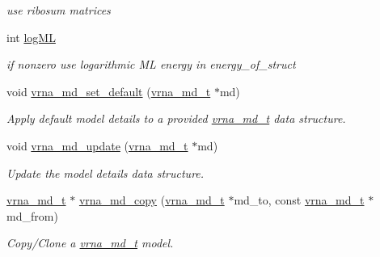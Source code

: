 \begin{DoxyCompactItemize}
\begin{DoxyCompactList}\small\item\em use ribosum matrices \end{DoxyCompactList}\item 
int \hyperlink{group__model__details_ga80c3c5fd35e7479704cc91d2d0367743}{log\+ML}\hypertarget{group__model__details_ga80c3c5fd35e7479704cc91d2d0367743}{}\label{group__model__details_ga80c3c5fd35e7479704cc91d2d0367743}

\begin{DoxyCompactList}\small\item\em if nonzero use logarithmic ML energy in energy\+\_\+of\+\_\+struct \end{DoxyCompactList}\item 
void \hyperlink{group__model__details_ga8ac6ff84936282436f822644bf841f66}{vrna\+\_\+md\+\_\+set\+\_\+default} (\hyperlink{group__model__details_ga1f8a10e12a0a1915f2a4eff0b28ea17c}{vrna\+\_\+md\+\_\+t} $\ast$md)
\begin{DoxyCompactList}\small\item\em Apply default model details to a provided \hyperlink{group__model__details_ga1f8a10e12a0a1915f2a4eff0b28ea17c}{vrna\+\_\+md\+\_\+t} data structure. \end{DoxyCompactList}\item 
void \hyperlink{group__model__details_ga36ae40b8c3b82362f5798ad5b047b814}{vrna\+\_\+md\+\_\+update} (\hyperlink{group__model__details_ga1f8a10e12a0a1915f2a4eff0b28ea17c}{vrna\+\_\+md\+\_\+t} $\ast$md)
\begin{DoxyCompactList}\small\item\em Update the model details data structure. \end{DoxyCompactList}\item 
\hyperlink{group__model__details_ga1f8a10e12a0a1915f2a4eff0b28ea17c}{vrna\+\_\+md\+\_\+t} $\ast$ \hyperlink{group__model__details_ga619057a740918b5fb01808362bb67aea}{vrna\+\_\+md\+\_\+copy} (\hyperlink{group__model__details_ga1f8a10e12a0a1915f2a4eff0b28ea17c}{vrna\+\_\+md\+\_\+t} $\ast$md\+\_\+to, const \hyperlink{group__model__details_ga1f8a10e12a0a1915f2a4eff0b28ea17c}{vrna\+\_\+md\+\_\+t} $\ast$md\+\_\+from)
\begin{DoxyCompactList}\small\item\em Copy/\+Clone a \hyperlink{group__model__details_ga1f8a10e12a0a1915f2a4eff0b28ea17c}{vrna\+\_\+md\+\_\+t} model. \end{DoxyCompactList}\item 

\end{DoxyCompactItemize}
